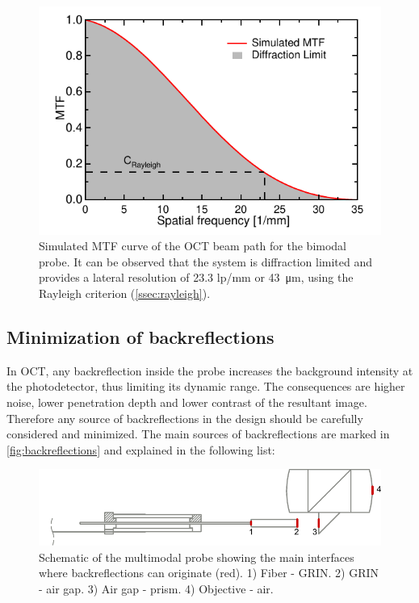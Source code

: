 \begin{figure}[h!]\centering
      \includegraphics{figures/30_DesignSimulation/Optical/MTF/MTF_Sim.pdf}
      \caption{Simulated MTF curve of the OCT beam path for the bimodal probe. It can be observed that the system is diffraction limited and provides a lateral resolution of 23.3 lp/mm or \SI{43}{\micro\meter}, using the Rayleigh criterion (\autoref{ssec:rayleigh}).}
      \label{fig:MTFsim}
\end{figure}

\subsection{Minimization of backreflections}
In OCT, any backreflection inside the probe increases the background intensity at the photodetector, thus limiting its dynamic range. The consequences are higher noise, lower penetration depth and lower contrast of the resultant image. Therefore any source of backreflections in the design should be carefully considered and minimized. The main sources of backreflections are marked in \autoref{fig:backreflections} and explained in the following list:

\begin{figure}[h!]\centering
      \includegraphics{figures/30_DesignSimulation/Optical/Backreflections/backreflections.pdf}
      \caption{Schematic of the multimodal probe showing the main interfaces where backreflections can originate (red). 1) Fiber - GRIN. 2) GRIN - air gap. 3) Air gap - prism. 4) Objective - air. }
      \label{fig:backreflections}
\end{figure}

